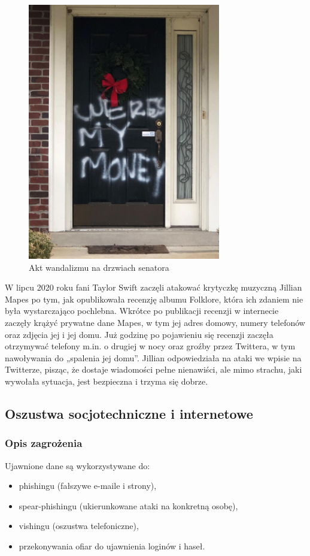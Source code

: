 \begin{figure}[H]
  \centering
  \includegraphics[width=0.75\textwidth]{images/vandalism.jpg}
  \caption{Akt wandalizmu na drzwiach senatora}
  \label{fig:vandalism}
\end{figure} 

W lipcu 2020 roku fani Taylor Swift zaczęli atakować krytyczkę muzyczną Jillian Mapes po tym, jak opublikowała recenzję albumu Folklore, która ich zdaniem nie była wystarczająco pochlebna. Wkrótce po publikacji recenzji w internecie zaczęły krążyć prywatne dane Mapes, w tym jej adres domowy, numery telefonów oraz zdjęcia jej i jej domu.
Już godzinę po pojawieniu się recenzji zaczęła otrzymywać telefony m.in. o drugiej w nocy oraz groźby przez Twittera, w tym nawoływania do „spalenia jej domu”.
Jillian odpowiedziała na ataki we wpisie na Twitterze, pisząc, że dostaje wiadomości pełne nienawiści, ale mimo strachu, jaki wywołała sytuacja, jest bezpieczna i trzyma się dobrze.

\subsection{Oszustwa socjotechniczne i internetowe}
\subsubsection{Opis zagrożenia}
Ujawnione dane są wykorzystywane do:
\begin{itemize}
  \item phishingu (fałszywe e-maile i strony),
  \item spear-phishingu (ukierunkowane ataki na konkretną osobę),
  \item vishingu (oszustwa telefoniczne),
  \item przekonywania ofiar do ujawnienia loginów i haseł.
\end{itemize}


